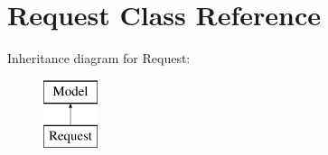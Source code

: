 \hypertarget{classapp_1_1models_1_1_request}{}\section{Request Class Reference}
\label{classapp_1_1models_1_1_request}
Inheritance diagram for Request\+:\begin{figure}[H]
\begin{center}
\leavevmode
\includegraphics[height=2.000000cm]{classapp_1_1models_1_1_request}
\end{center}
\end{figure}
